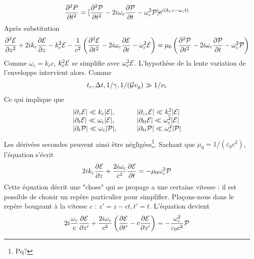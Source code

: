 \begin{equation}
\frac{{{\partial ^2}P}}{{\partial {t^2}}} = [\frac{{{\partial ^2}{\cal P}}}{{\partial {t^2}}} - 2i{\omega _c}\frac{{\partial {\cal P}}}{{\partial t}} - \omega _c^2{\cal P}]{{\mathop{\rm e}\nolimits} ^{i({k_c}z - {\omega _c}t)}}
\end{equation}
Après substitution
\begin{equation}
\frac{{{\partial ^2}{\cal E}}}{{\partial {z^2}}} + 2i{k_c}\frac{{\partial {\cal E}}}{{\partial z}} - k_c^2{\cal E} - \frac{1}{{{c^2}}}\left( {\frac{{{\partial ^2}{\cal E}}}{{\partial {t^2}}} - 2i{\omega _c}\frac{{\partial {\cal E}}}{{\partial t}} - \omega _c^2{\cal E}} \right) = {\mu _0}\left( {\frac{{{\partial ^2}{\cal P}}}{{\partial {t^2}}} - 2i{\omega _c}\frac{{\partial {\cal P}}}{{\partial t}} - \omega _c^2{\cal P}} \right)
\end{equation}
Comme $\omega_c=k_cc$, $k_c^2{\cal E}$ se simplifie avec ${\omega _c^2{\cal E}}$. L'hypothèse de la 
lente variation de l'enveloppe intervient alors. Comme
\begin{equation}
{t_c},{\rm{ }}\Delta t,{\rm{ }}1/\gamma ,{\rm{ 1/(}}{{\cal G}}{v_g}) \gg 1/{\nu _c}
\end{equation}
Ce qui implique que
\begin{equation}
\begin{array}{ll}
|{\partial _z}{\cal E}| \ll {k_c}|{\cal E}| {\rm{       }},&\qquad|{\partial _{zz}}{\cal E}| \ll k_c^2|{\cal E}|{\rm{ }}\\
|{\partial _t}{\cal E}| \ll {\omega _c}|{\cal E}| {\rm{       }},&\qquad|{\partial _{tt}}{\cal E}| \ll \omega _c^2|{\cal E}|\\
|{\partial _t}{\cal P}| \ll {\omega _c}|{\cal P}|       ,&\qquad|{\partial _{tt}}{\cal P}| \ll \omega _c^2|{\cal P}|
\end{array}
\end{equation}
Les dérivées secondes peuvent ainsi être négligées\footnote{Pq?}. Sachant que $\mu_0=1/
(\varepsilon_0c^2)$, 
l'équation s'écrit
\begin{equation}
2i{k_c}\frac{{\partial {\cal E}}}{{\partial z}} + \frac{{2i{\omega _c}}}{{{c^2}}}\frac{{\partial {\cal E}}}{{\partial t}} =  - {\mu _0}\omega _c^2{\cal P}
\end{equation}
Cette équation décrit une "chose" qui se propage a une certaine vitesse : il est possible de choisir 
un repère particulier pour simplifier. Plaçons-nous dans le repère bougeant à la vitesse $c$ : $
z'=z-ct, t'=t$. L'équation devient
\begin{equation}
2i\frac{{{\omega _c}}}{c}\frac{{\partial {\cal E}}}{{\partial z'}} + \frac{{2i{\omega _c}}}{{{c^2}}}\left(\frac{{\partial {\cal E}}}{{\partial t'}} - c\frac{{\partial {\cal E}}}{{\partial z'}}\right) =  - \frac{{\omega _c^2}}{{{\varepsilon _0}{c^2}}}{\cal P}
\end{equation}

